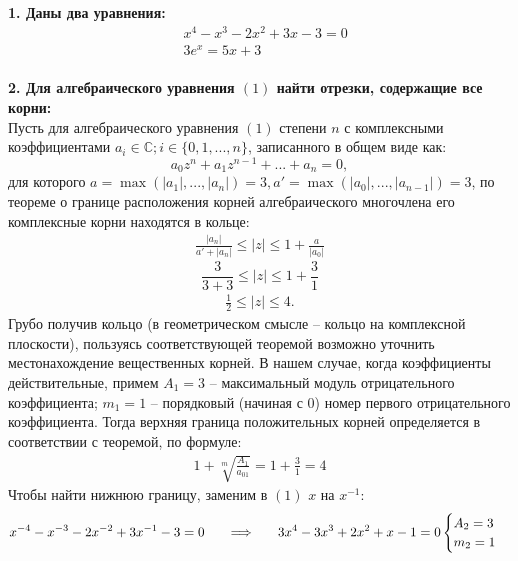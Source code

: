 





\newpage
{}
\setcounter{page}{2}
{\Large{\textbf{1. Даны два уравнения:}}}
\begin{align}
    &x^4-x^3-2x^2+3x-3=0\\
    &3e^x=5x+3
\end{align}\\

{\Large{\textbf{2. Для алгебраического уравнения $(1)$ найти отрезки, содержащие все корни:}}}\\
Пусть для алгебраического уравнения $(1)$ степени $n$ с комплексными коэффициентами $a_i\in\mathbb{C}; i\in \{0, 1, ..., n\}$, записанного в общем виде как:
\[
    a_0z^n+a_1z^{n-1}+...+a_n=0,
\]
для которого $a=\max(|a_1|,...,|a_n|)=3, a'=\max(|a_0|,...,|a_{n-1}|)=3$, по теореме о границе расположения корней алгебраического многочлена его комплексные корни находятся в кольце:
\begin{align}
    \frac{|a_n|}{a'+|a_n|}\le |z| \le 1+\frac{a}{|a_0|}
\end{align}
\[
    \frac{3}{3+3}\le |z| \le 1+\frac{3}{1}
\]
\begin{align}
    \frac{1}{2}\le |z| \le 4.
\end{align}
Грубо получив кольцо (в геометрическом смысле -- кольцо на комплексной плоскости), пользуясь соответствующей теоремой возможно уточнить местонахождение вещественных корней. В нашем случае, когда коэффициенты действительные, примем $A_1=3$ -- максимальный модуль отрицательного коэффициента; $m_1=1$ -- порядковый (начиная с $0$) номер первого отрицательного коэффициента. Тогда верхняя граница положительных корней определяется в соответствии с теоремой, по формуле:
\begin{align}
    1 + \sqrt[m]{\frac{A_1}{a_{01}}} = 1 +\frac{3}{1} = 4
\end{align}
Чтобы найти нижнюю границу, заменим в $(1)$ $x$ на $x^{-1}$:
\begin{align}
    x^{-4}-x^{-3}-2x^{-2}+3x^{-1}-3=0 \hspace{0.5cm} \implies \hspace{0.5cm}
    3x^4-3x^3+2x^2+x-1=0
    \begin{cases}
        A_2 = 3 \\
        m_2 = 1
    \end{cases}
\end{align}
